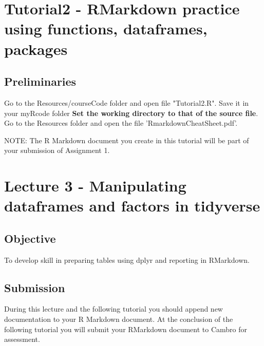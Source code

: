 \documentclass[titlepage]{book}\usepackage{knitr}
\begin{document}
\chapter{Tutorial2 - RMarkdown practice using functions, dataframes, packages}
\author{Brian Williams $<$\href{mailto:bjw649@gmail.com}%
{bjw649@gmail.com}$>$}

\section{Preliminaries}

Go to the Resources/courseCode folder and open file "Tutorial2.R". Save it in your myRcode folder
\textbf{Set the working directory to that of the source file}.
Go to the Resources folder and open the file 'RmarkdownCheatSheet.pdf'.

NOTE: The R Markdown document you create in this tutorial will be part of your submission of Assignment 1.












\chapter{Lecture 3 - Manipulating dataframes and factors in tidyverse}\label{L3}  

\author{Brian Williams $<$\href{mailto:bjw649@gmail.com}%
{bjw649@gmail.com}$>$}


\section{Objective}
To develop skill in preparing tables using dplyr and reporting in RMarkdown.

\section{Submission}
During this lecture and the following tutorial you should append new documentation to your R Markdown document. At the conclusion of the following tutorial you will submit your RMarkdown document to Cambro for assessment.
\end{document}
